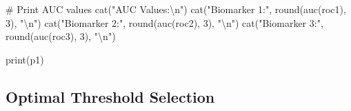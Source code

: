 \documentclass[
  11pt,
  letterpaper,
  oneside]{book}
\newenvironment{Shaded}{\begin{snugshade}}{\end{snugshade}}
\newcommand{\CommentTok}[1]{\textcolor[rgb]{0.37,0.37,0.37}{#1}}
\newcommand{\DecValTok}[1]{\textcolor[rgb]{0.68,0.00,0.00}{#1}}
\newcommand{\FunctionTok}[1]{\textcolor[rgb]{0.28,0.35,0.67}{#1}}
\newcommand{\NormalTok}[1]{\textcolor[rgb]{0.00,0.23,0.31}{#1}}
\newcommand{\SpecialCharTok}[1]{\textcolor[rgb]{0.37,0.37,0.37}{#1}}
\newcommand{\StringTok}[1]{\textcolor[rgb]{0.13,0.47,0.30}{#1}}
\begin{document}
\begin{Shaded}
\begin{Highlighting}[]
\CommentTok{\# Print AUC values}
\FunctionTok{cat}\NormalTok{(}\StringTok{"AUC Values:}\SpecialCharTok{\textbackslash{}n}\StringTok{"}\NormalTok{)}
\FunctionTok{cat}\NormalTok{(}\StringTok{"Biomarker 1:"}\NormalTok{, }\FunctionTok{round}\NormalTok{(}\FunctionTok{auc}\NormalTok{(roc1), }\DecValTok{3}\NormalTok{), }\StringTok{"}\SpecialCharTok{\textbackslash{}n}\StringTok{"}\NormalTok{)}
\FunctionTok{cat}\NormalTok{(}\StringTok{"Biomarker 2:"}\NormalTok{, }\FunctionTok{round}\NormalTok{(}\FunctionTok{auc}\NormalTok{(roc2), }\DecValTok{3}\NormalTok{), }\StringTok{"}\SpecialCharTok{\textbackslash{}n}\StringTok{"}\NormalTok{)}
\FunctionTok{cat}\NormalTok{(}\StringTok{"Biomarker 3:"}\NormalTok{, }\FunctionTok{round}\NormalTok{(}\FunctionTok{auc}\NormalTok{(roc3), }\DecValTok{3}\NormalTok{), }\StringTok{"}\SpecialCharTok{\textbackslash{}n}\StringTok{"}\NormalTok{)}

\FunctionTok{print}\NormalTok{(p1)}
\end{Highlighting}
\end{Shaded}

\subsection{Optimal Threshold
Selection}\label{optimal-threshold-selection}
\end{document}
